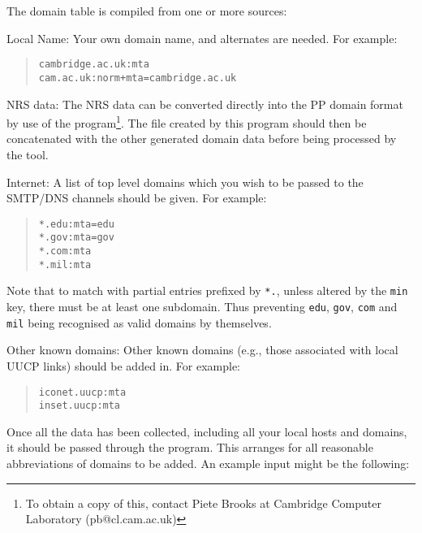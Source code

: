 The domain table is compiled from one or more sources:

\begin{describe}
\item[Local Name:]
Your own domain name, and alternates are needed.  For example:

\begin{quote}\small\begin{verbatim}
cambridge.ac.uk:mta
cam.ac.uk:norm+mta=cambridge.ac.uk
\end{verbatim}\end{quote}


\item[NRS data:]	
The NRS data can be converted directly into the PP domain format by
use of the  program\footnote{ To obtain a copy of this,
contact Piete Brooks at Cambridge Computer Laboratory (pb@cl.cam.ac.uk)}.
The file  created by this program should then be
concatenated with the other generated domain data before being
processed by the  tool.

\item[Internet:]
A list of top level domains which you wish to be passed to the SMTP/DNS
channels should be given.  For example:

\begin{quote}\small\begin{verbatim}
*.edu:mta=edu
*.gov:mta=gov
*.com:mta
*.mil:mta
\end{verbatim}\end{quote}

Note that to match with partial entries prefixed by \verb+*.+, unless
altered by the \verb+min+ key, there must be at least one subdomain.
Thus preventing \verb+edu+,
\verb+gov+, \verb+com+ and \verb+mil+ being recognised as valid
domains by themselves.

\item[Other known domains:]	
Other known domains (e.g., those associated with local UUCP links)
should be added in.  For example:

\begin{quote}\small\begin{verbatim}
iconet.uucp:mta
inset.uucp:mta
\end{verbatim}\end{quote}

\end{describe}

Once all the data has been collected, including all your local hosts
and domains, it should be passed through the  program.
This arranges for all reasonable abbreviations of domains to be added.
An example input might be the following:

